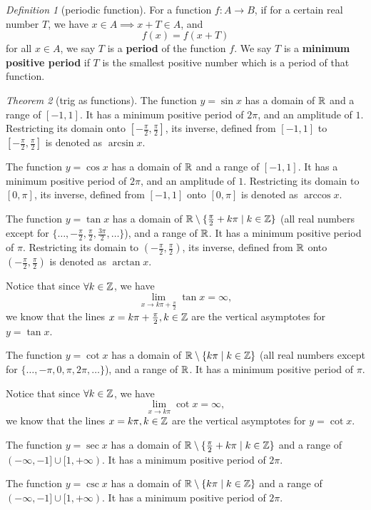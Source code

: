 \documentclass[8pt]{article}
\theoremstyle{remark}
\newtheorem{theorem}{Theorem}[section]
\newtheorem{definition}[theorem]{Definition}
\begin{document}
        \begin{definition}[periodic function]
            For a function $f: A \rightarrow B$, if for a certain real number $T$, we have $x \in A \implies x + T \in A$, and
            $$f(x) = f(x + T)$$
            for all $x \in A$, we say $T$ is a \textbf{period} of the function $f$. We say $T$ is a \textbf{minimum positive period} if $T$ is the smallest positive number which is a period of that function.
        \end{definition}

        \begin{theorem}[trig as functions]
            The function $y = \sin x$ has a domain of $\mathbb{R}$ and a range of $[-1, 1]$. It has a minimum positive period of $2\pi$, and an amplitude of $1$. Restricting its domain onto $[-\frac{\pi}{2}, \frac{\pi}{2}]$, its inverse, defined from $[-1, 1]$ to $[-\frac{\pi}{2}, \frac{\pi}{2}]$ is denoted as $\arcsin x$.

            The function $y = \cos x$ has a domain of $\mathbb{R}$ and a range of $[-1, 1]$. It has a minimum positive period of $2\pi$, and an amplitude of $1$. Restricting its domain to $[0, \pi]$, its inverse, defined from $[-1, 1]$ onto $[0, \pi]$ is denoted as $\arccos x$.

            The function $y = \tan x$ has a domain of $\mathbb{R} \setminus \{\frac{\pi}{2} + k\pi \mid k \in \mathbb{Z}\}$ (all real numbers except for $\{\ldots, -\frac{\pi}{2}, \frac{\pi}{2}, \frac{3\pi}{2}, \ldots\}$), and a range of $\mathbb{R}$. It has a minimum positive period of $\pi$. Restricting its domain to $(-\frac{\pi}{2}, \frac{\pi}{2})$, its inverse, defined from $\mathbb{R}$ onto $(-\frac{\pi}{2}, \frac{\pi}{2})$ is denoted as $\arctan x$.

            Notice that since $\forall k \in \mathbb{Z}$, we have
            $$
                \lim_{x \rightarrow k\pi + \frac{\pi}{2}} \tan x = \infty,
            $$
            we know that the lines $x = k\pi + \frac{\pi}{2}, k \in \mathbb{Z}$ are the vertical asymptotes for $y = \tan x$.

            The function $y = \cot x$ has a domain of $\mathbb{R} \setminus \{k\pi \mid k \in \mathbb{Z}\}$ (all real numbers except for $\{\ldots, -\pi, 0, \pi, 2\pi, \ldots\}$), and a range of $\mathbb{R}$. It has a minimum positive period of $\pi$.

            Notice that since $\forall k \in \mathbb{Z}$, we have
            $$
                \lim_{x \rightarrow k\pi} \cot x = \infty,
            $$
            we know that the lines $x = k\pi, k \in \mathbb{Z}$ are the vertical asymptotes for $y = \cot x$.

            The function $y = \sec x$ has a domain of $\mathbb{R} \setminus \{\frac{\pi}{2} + k\pi \mid k \in \mathbb{Z}\}$ and a range of $(-\infty, -1] \cup [1, +\infty)$. It has a minimum positive period of $2\pi$.

            The function $y = \csc x$ has a domain of $\mathbb{R} \setminus \{k\pi \mid k \in \mathbb{Z}\}$ and a range of $(-\infty, -1] \cup [1, +\infty)$. It has a minimum positive period of $2\pi$.
        \end{theorem}
\end{document}

